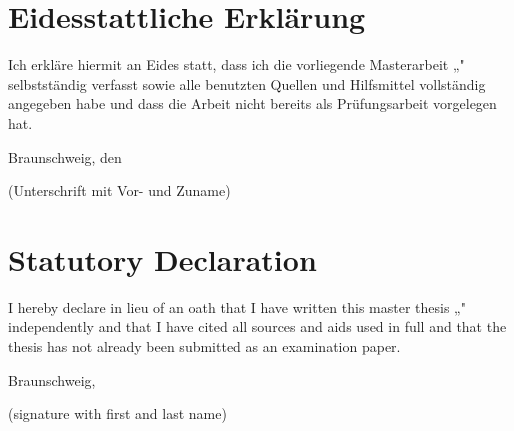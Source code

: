 \documentclass[%
    language=english,        %
    paper=a4paper,
    twoside=false,
    parskip=half,
    gauss]{tubsCD/tubscd}
\theoremstyle{remark}
\theoremstyle{definition}
\theoremstyle{remark}
\begin{document}








\listoffigures
\listoftables
\printbibliography


{
    \chapter{Eidesstattliche Erklärung}

    Ich erkläre hiermit an Eides statt, dass ich die vorliegende Masterarbeit 
    „\myPaperTitle" selbstständig verfasst sowie alle benutzten Quellen und 
    Hilfsmittel vollständig angegeben habe und dass die Arbeit nicht bereits 
    als Prüfungsarbeit vorgelegen hat.

    \vspace{1cm}

    Braunschweig, den \mySubmissionDate

    \vspace{3cm}

    \underline{\hspace{10cm}}

    (Unterschrift mit Vor- und Zuname)
}{
    \chapter{Statutory Declaration}

    I hereby declare in lieu of an oath that I have written this master thesis „\myPaperTitleWithoutBreaks" independently and that I have cited all sources and aids used in full and that the thesis has not already been submitted as an examination paper.

    \vspace{1cm}

    Braunschweig, \mySubmissionDate

    \vspace{3cm}

    \underline{\hspace{10cm}}

    (signature with first and last name)
}
\end{document}
